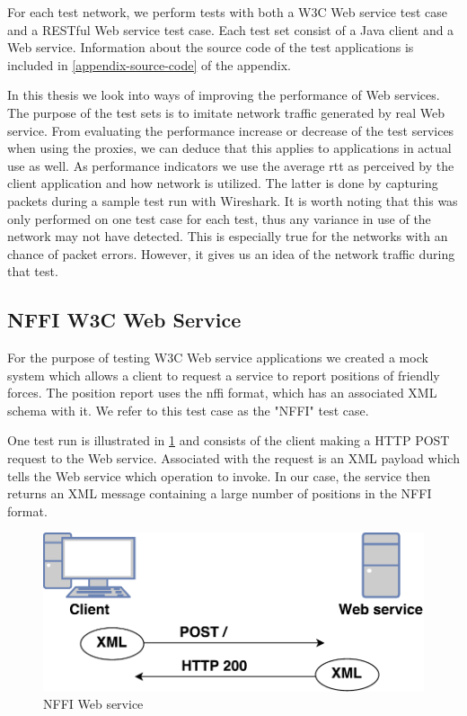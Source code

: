 For each test network, we perform tests with both a W3C Web service test case
and a RESTful Web service test case. Each test set consist of a Java client and
a Web service. Information about the source code of the test applications is
included in \cref{appendix-source-code} of the appendix.

In this thesis we look into ways of improving the performance of Web services.
The purpose of the test sets is to imitate network traffic generated by real Web
service. From evaluating the performance increase or decrease of the test
services when using the proxies, we can deduce that this applies to applications
in actual use as well. As performance indicators we use the average \gls{rtt} as
perceived by the client application and how network is utilized. The latter is
done by capturing packets during a sample test run with Wireshark. It is worth
noting that this was only performed on one test case for each test, thus any
variance in use of the network may not have detected. This is especially true
for the networks with an chance of packet errors. However, it gives us an idea
of the network traffic during that test.

\subsection{NFFI W3C Web Service}

For the purpose of testing W3C Web service applications we created a mock system
which allows a client to request a service to report positions of friendly
forces. The position report uses the \gls{nffi} format, which has an associated
XML schema with it. We refer to this test case as the "NFFI" test case.

One test run is illustrated in \cref{figure-nffi-flow} and consists of the
client making a HTTP POST request to the Web service. Associated with the
request is an XML payload which tells the Web service which operation to invoke.
In our case, the service then returns an XML message containing a large number
of positions in the NFFI format.

\begin{figure}[h]
\centering
\includegraphics[scale=0.6]{images/nffi_flow.pdf}
\caption{NFFI Web service}
\label{figure-nffi-flow}
\end{figure}

